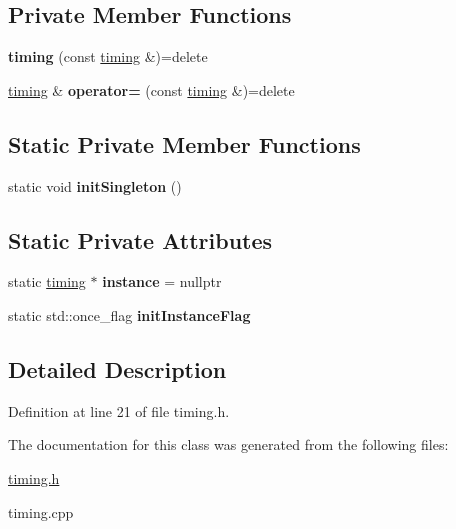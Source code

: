 \subsection*{Private Member Functions}
\begin{DoxyCompactItemize}
\item 
\mbox{\label{classtiming_ae7c2f1ad143d9dc5f56d30ab447bcdd6}} 
{\bfseries timing} (const \mbox{\hyperlink{classtiming}{timing}} \&)=delete
\item 
\mbox{\label{classtiming_a30b82d8d0d6ca5350e23cd34a9e1ba7e}} 
\mbox{\hyperlink{classtiming}{timing}} \& {\bfseries operator=} (const \mbox{\hyperlink{classtiming}{timing}} \&)=delete
\end{DoxyCompactItemize}
\subsection*{Static Private Member Functions}
\begin{DoxyCompactItemize}
\item 
\mbox{\label{classtiming_a692446f24b88e08f46243324a5f85ff7}} 
static void {\bfseries init\+Singleton} ()
\end{DoxyCompactItemize}
\subsection*{Static Private Attributes}
\begin{DoxyCompactItemize}
\item 
\mbox{\label{classtiming_aa3ac445dda7e069d4df60be71fdabafe}} 
static \mbox{\hyperlink{classtiming}{timing}} $\ast$ {\bfseries instance} = nullptr
\item 
\mbox{\label{classtiming_a227481b54d97006b91aa6bd1cb2eec65}} 
static std\+::once\+\_\+flag {\bfseries init\+Instance\+Flag}
\end{DoxyCompactItemize}


\subsection{Detailed Description}


Definition at line 21 of file timing.\+h.



The documentation for this class was generated from the following files\+:\begin{DoxyCompactItemize}
\item 
\mbox{\hyperlink{timing_8h}{timing.\+h}}\item 
timing.\+cpp\end{DoxyCompactItemize}
